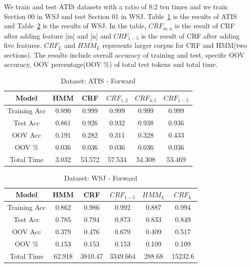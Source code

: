 \documentclass[journal, a4paper]{IEEEtran}
\begin{document}
We train and test ATIS datasets with a ratio of 8:2 ten times and we train Section 00 in WSJ and test Section 01 in WSJ. Table~\ref{tab:1} is the results of ATIS and Table~\ref{tab:2} is the results of WSJ. In the table, $CRF_{m,n}$ is the result of CRF after adding feature [m] and [n] and $CRF_{1-5}$ is the result of CRF after adding five features.  $CRF_{L}$ and $HMM_{L}$ represents larger corpus for CRF and HMM(two sections). The results include overall accuracy of training and test, specific OOV accuracy, OOV percentage(OOV \%) of total test tokens and total time.
	\begin{table}[!hbt]
		\begin{center}
		\caption{Dataset: ATIS - Forward}
		\label{tab:1}
		\begin{tabular}{|c|c|c|c|c|c|}
			\hline
			Model & HMM & CRF & $CRF_{1,2}$ & $CRF_{4,5}$ &$CRF_{1-5}$\\ \hline
			 Training Acc & 0.890  & 0.999 & 0.999 & 0.999 & 0.999\\ \hline
			 Test Acc  & 0.861 &  0.926 & 0.932 & 0.938 & 0.936\\ \hline
			OOV Acc & 0.191 & 0.282 & 0.311 & 0.328 & 0.433\\ \hline
			OOV \% & 0.036 & 0.036 & 0.036 & 0.036 & 0.036\\\hline
			 Total Time & 3.032 & 53.572 & 57.534 & 54.308 & 53.469\\ 
			 \hline
		\end{tabular}
		\end{center}
		\vspace{-5mm}
	\end{table}

	\begin{table}[!hbt]
		\begin{center}
		\caption{Dataset: WSJ - Forward}
		\label{tab:2}
		\begin{tabular}{|c|c|c|c|c|c|}
			\hline
			Model & HMM & CRF & $CRF_{1-5}$ & $HMM_{L}$ & $CRF_{L}$\\ \hline
			 Training Acc & 0.862  & 0.986 & 0.992 & 0.887 & 0.994 \\ \hline
			 Test Acc  & 0.785 &  0.794 & 0.873 & 0.833 &0.849\\ \hline
			OOV Acc & 0.379 & 0.476 & 0.679 & 0.409 &0.517\\ \hline
			OOV \% & 0.153 & 0.153 & 0.153 & 0.109 & 0.109\\\hline
			 Total Time & 62.918 & 3810.47 & 3349.664 & 288.68 &15232.6 \\ 
			 \hline
		\end{tabular}
		\end{center}
		\vspace{-5mm}
	\end{table}
	
\end{document}
